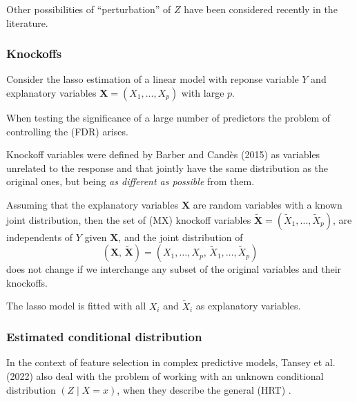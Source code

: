 Other possibilities of ``perturbation'' of $Z$ have been considered
recently in the literature.

\subsubsection{Knockoffs}

Consider the lasso estimation of a linear model with
reponse variable $Y$ and explanatory variables
$\boldsymbol{X} = (X_1,\ldots,X_p)$ with large $p$.

When testing the significance of a large number of predictors
the problem of controlling the  (FDR)
arises.

\begin{definition}{Knockoff variables}{} 
	were defined by Barber and Candès (2015) as
	variables unrelated to the response and that jointly
	have the same distribution as the original ones,
	but being \emph{as different as possible} from them.
\end{definition}

Assuming that the explanatory variables $\boldsymbol{X}$ are
random variables with a known joint distribution, then
the set of  (MX)
knockoff variables $\tilde{\boldsymbol{X}} = (\tilde{X}_1,\ldots,\tilde{X}_p)$,
are independents of $Y$ given $\boldsymbol{X}$, and the joint distribution of
\begin{equation*}
	(\boldsymbol{X},\,\tilde{\boldsymbol{X}}) =
	\left( X_1,\ldots,X_p,\,\tilde{X}_1,\ldots,\tilde{X}_p \right)
\end{equation*}
does not change if we interchange any subset of the original variables
and their knockoffs.

The lasso model is fitted with all $X_i$ and $\tilde{X}_i$ as
explanatory variables.


\subsubsection{Estimated conditional distribution}

In the context of feature selection in complex predictive models,
Tansey et al. (2022) also deal with the problem of working with
an unknown conditional distribution $(Z \mid X = x)$, when
they describe the general  (HRT)
.

